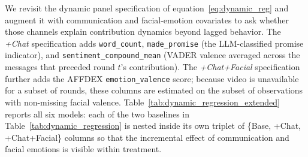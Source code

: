 \documentclass[12pt,letterpaper,english]{article}
\begin{document}
We revisit the dynamic panel specification of equation~\ref{eq:dynamic_reg} and
augment it with communication and facial-emotion covariates to ask whether
those channels explain contribution dynamics beyond lagged behavior. The
\emph{+Chat} specification adds \texttt{word\_count}, \texttt{made\_promise}
(the LLM-classified promise indicator), and \texttt{sentiment\_compound\_mean}
(VADER valence averaged across the messages that preceded round $t$'s
contribution). The \emph{+Chat+Facial} specification further adds the AFFDEX
\texttt{emotion\_valence} score; because video is unavailable for a subset of
rounds, these columns are estimated on the subset of observations with
non-missing facial valence. Table~\ref{tab:dynamic_regression_extended}
reports all six models: each of the two baselines in
Table~\ref{tab:dynamic_regression} is nested inside its own triplet of
\{Base, +Chat, +Chat+Facial\} columns so that the incremental effect of
communication and facial emotions is visible within treatment.

\begin{table}[H]
    \centering \footnotesize
    
    \caption{Dynamic Panel Regression Analysis with Communication and Facial
    Emotions. Columns are grouped into two baselines (IF, AF) using the
    group-mean deviation regressors; each baseline is reported in three
    specifications (Base, +Chat, +Chat+Facial). Arellano-Bond two-step GMM
    with Windmeijer-corrected robust standard errors in parentheses.
    Instruments: lags 2--5 of contribution.}
    \label{tab:dynamic_regression_extended}
\end{table}
\end{document}

